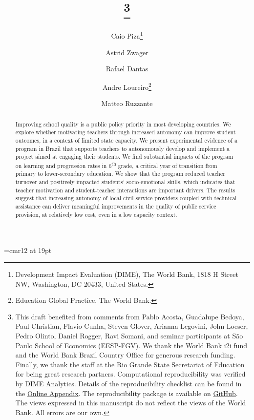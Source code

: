 \documentclass[11pt,a4paper]{article}
\begin{document}

\font\myfont=cmr12 at 19pt
\title{\thanks{This draft benefited from comments from Pablo Acosta, Guadalupe Bedoya, Paul Christian, Flavio Cunha, Steven Glover, Arianna Legovini, John Loeser, Pedro Olinto, Daniel Rogger, Ravi Somani, and seminar participants at São Paulo School of Economics (EESP-FGV). We thank the World Bank i2i fund and the World Bank Brazil Country Office for generous  research  funding. Finally, we thank the staff at the Rio Grande State Secretariat of Education for being great research partners. Computational reproducibility was verified by DIME Analytics. Details of the reproducibility checklist can be found in the \href{https://github.com/worldbank/brazil-pip-education/blob/master/pip_app.pdf}{Online Appendix}. The reproducibility package is available on \href{https://github.com/worldbank/brazil-pip-education}{GitHub}. The views expressed in this manuscript do not reflect the views of the World Bank. All errors are our own.}}

\newcommand*\samethanks[1][\value{footnote}]{\footnotemark[#1]}

\author{%
    Caio Piza\thanks{Development Impact Evaluation (DIME), The World Bank, 1818 H Street NW, Washington, DC 20433, United States.}%
    \and Astrid Zwager\samethanks[2]%
    \and Rafael Dantas\samethanks[2]%
    \and Andre Loureiro\thanks{Education Global Practice, The World Bank.}%
    \and Matteo Ruzzante\samethanks[2]
}

\date{}

\maketitle

\begin{abstract}
    \noindent Improving school quality is a public policy priority in most developing countries. We explore whether motivating teachers through increased autonomy can improve student outcomes, in a context of limited state capacity. We present experimental evidence of a program in Brazil that supports teachers to autonomously develop and implement a project aimed at engaging their students. We find substantial impacts of the program on learning and progression rates in 6\textsuperscript{th} grade, a critical year of transition from primary to lower-secondary education. We show that the program reduced teacher turnover and positively impacted students' socio-emotional skills, which indicates that teacher motivation and student-teacher interactions are important drivers. The results suggest that increasing autonomy of local civil service providers coupled with technical assistance can deliver meaningful improvements in the quality of public service provision, at relatively low cost, even in a low capacity context.
\end{abstract}
\end{document}
